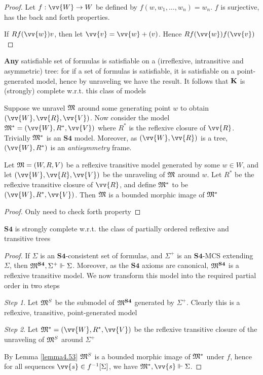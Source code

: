 \documentclass[11pt]{article}
\begin{document}
\begin{proof}
Let \(f:\vv{W}\to W\) be defined by \(f(w,w_1,\dots,w_n)=w_n\). \(f\) is
surjective, has the back and forth properties.

If \(Rf(\vv{w})v\), then let \(\vv{v}=\vv{w}+(v)\). Hence \(Rf(\vv{w})f(\vv{v})\)
\end{proof}

\textbf{Any} satisfiable set of formulas is satisfiable on a (irreflexive,
intransitive and asymmetric) tree: for if a set of formulas is satisfiable,
it is satisfiable on a point-generated model, hence by unraveling we have the
result. It follows that \(\operatorname{\textbf{K}}\) is (strongly) complete w.r.t. this class of models

Suppose we unravel \(\mathfrak{M}\) around some generating point \(w\) to obtain
\((\vv{W},\vv{R},\vv{V})\). Now consider the model
\(\fM^*=(\vv{W},R^*,\vv{V})\) where \(R^*\) is the reflexive closure of
\(\vv{R}\). Trivially \(\mathfrak{M}^*\) is an \(\textbf{S4}\) model. Moreover, as
\((\vv{W},\vv{R})\) is a tree, \((\vv{W},R^*)\) is an \emph{antisymmetry} frame.

\begin{lemma}[]
\label{lemma4.53}
Let \(\mathfrak{M}=(W,R,V)\) be a reflexive transitive model generated by some
\(w\in W\), and let \((\vv{W},\vv{R},\vv{V})\) be the unraveling of \(\mathfrak{M}\)
around \(w\). Let \(R^*\) be the reflexive transitive closure of \(\vv{R}\),
and define \(\mathfrak{M}^*\) to be \((\vv{W},R^*,\vv{V})\). Then \(\mathfrak{M}\) is a bounded
morphic image of \(\mathfrak{M}^*\)
\end{lemma}

\begin{proof}
Only need to check forth property
\end{proof}

\begin{theorem}[]
\(\textbf{S4}\) is strongly complete w.r.t. the class of partially ordered
reflexive and transitive trees
\end{theorem}

\begin{proof}
If \(\Sigma\) is an \(\textbf{S4}\)-consistent set of formulas, and \(\Sigma^+\) is an
\(\textbf{S4}\)-MCS extending \(\Sigma\), then \(\mathfrak{M}^{\textbf{S4}},\Sigma^+\Vdash\Sigma\).
Moreover, as the \(\textbf{S4}\) axioms are canonical, \(\mathfrak{M}^{\textbf{S4}}\)
is a reflexive transitive model. We now transform this model into the
required partial order in two steps

\emph{Step 1}. Let \(\mathfrak{M}^S\) be the submodel of \(\mathfrak{M}^{\textbf{S4}}\) generated by
\(\Sigma^+\). Clearly this is a reflexive, transitive, point-generated model

\emph{Step 2}. Let \(\fM^*=(\vv{W},R^*,\vv{V})\) be the reflexive transitive closure
of the unraveling of \(\mathfrak{M}^S\) around \(\Sigma^+\)

By Lemma \ref{lemma4.53} \(\mathfrak{M}^S\) is a bounded morphic image of \(\mathfrak{M}^*\)
under \(f\), hence for all sequences \(\vv{s}\in f^{-1}[\Sigma]\), we have \(\fM^*,\vv{s}\Vdash\Sigma\).
\end{proof}
\end{document}
